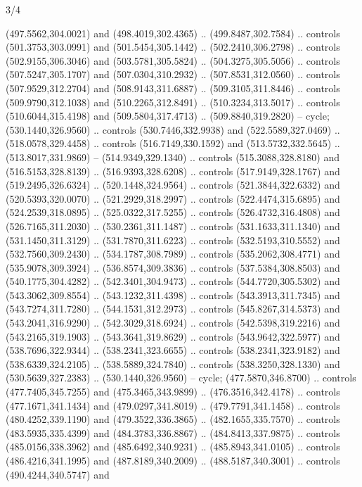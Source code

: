\begin{flagdescription}{3/4}
\begin{scope}[xshift=0.5\flaglength]
\begin{scope}[scale=0.002\flagwidth,yshift=146.5mm,xshift=-52mm]
\begin{scope}[y=0.80pt, x=0.80pt, yscale=-1, xscale=1, inner sep=0pt, outer sep=0pt]
\begin{scope}[cm={{1.03426,0.0,0.0,1.03426,(-229.44745,-87.97837)}}]
\begin{scope}[draw=black,fill=black,line join=round,line cap=round,line width=0.746\lw]
  (497.5562,304.0021) and (498.4019,302.4365) .. (499.8487,302.7584) .. controls
  (501.3753,303.0991) and (501.5454,305.1442) .. (502.2410,306.2798) .. controls
  (502.9155,306.3046) and (503.5781,305.5824) .. (504.3275,305.5056) .. controls
  (507.5247,305.1707) and (507.0304,310.2932) .. (507.8531,312.0560) .. controls
  (507.9529,312.2704) and (508.9143,311.6887) .. (509.3105,311.8446) .. controls
  (509.9790,312.1038) and (510.2265,312.8491) .. (510.3234,313.5017) .. controls
  (510.6044,315.4198) and (509.5804,317.4713) .. (509.8840,319.2820) -- cycle;
 (530.1440,326.9560) .. controls (530.7446,332.9938) and
  (522.5589,327.0469) .. (518.0578,329.4458) .. controls (516.7149,330.1592) and
  (513.5732,332.5645) .. (513.8017,331.9869) -- (514.9349,329.1340) .. controls
  (515.3088,328.8180) and (516.5153,328.8139) .. (516.9393,328.6208) .. controls
  (517.9149,328.1767) and (519.2495,326.6324) .. (520.1448,324.9564) .. controls
  (521.3844,322.6332) and (520.5393,320.0070) .. (521.2929,318.2997) .. controls
  (522.4474,315.6895) and (524.2539,318.0895) .. (525.0322,317.5255) .. controls
  (526.4732,316.4808) and (526.7165,311.2030) .. (530.2361,311.1487) .. controls
  (531.1633,311.1340) and (531.1450,311.3129) .. (531.7870,311.6223) .. controls
  (532.5193,310.5552) and (532.7560,309.2430) .. (534.1787,308.7989) .. controls
  (535.2062,308.4771) and (535.9078,309.3924) .. (536.8574,309.3836) .. controls
  (537.5384,308.8503) and (540.1775,304.4282) .. (542.3401,304.9473) .. controls
  (544.7720,305.5302) and (543.3062,309.8554) .. (543.1232,311.4398) .. controls
  (543.3913,311.7345) and (543.7274,311.7280) .. (544.1531,312.2973) .. controls
  (545.8267,314.5373) and (543.2041,316.9290) .. (542.3029,318.6924) .. controls
  (542.5398,319.2216) and (543.2165,319.1903) .. (543.3641,319.8629) .. controls
  (543.9642,322.5977) and (538.7696,322.9344) .. (538.2341,323.6655) .. controls
  (538.2341,323.9182) and (538.6339,324.2105) .. (538.5889,324.7840) .. controls
  (538.3250,328.1330) and (530.5639,327.2383) .. (530.1440,326.9560) -- cycle;
 (477.5870,346.8700) .. controls (477.7405,345.7255) and
  (475.3465,343.9899) .. (476.3516,342.4178) .. controls (477.1671,341.1434) and
  (479.0297,341.8019) .. (479.7791,341.1458) .. controls (480.4252,339.1190) and
  (479.3522,336.3865) .. (482.1655,335.7570) .. controls (483.5935,335.4399) and
  (484.3783,336.8867) .. (484.8413,337.9875) .. controls (485.0156,338.3962) and
  (485.6492,340.9231) .. (485.8943,341.0105) .. controls (486.4216,341.1995) and
  (487.8189,340.2009) .. (488.5187,340.3001) .. controls (490.4244,340.5747) and

\end{scope}
\end{scope}
\end{scope}
\end{scope}
\end{scope}
\end{flagdescription}

